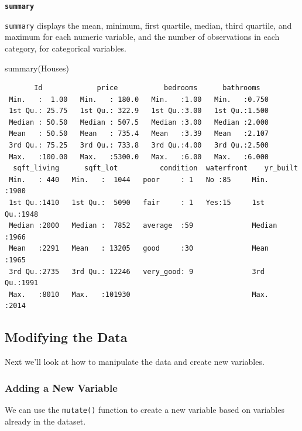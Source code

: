 \documentclass[
  letterpaper,
  DIV=11,
  numbers=noendperiod]{scrreprt}
\newenvironment{Shaded}{\begin{snugshade}}{\end{snugshade}}
\newcommand{\FunctionTok}[1]{\textcolor[rgb]{0.28,0.35,0.67}{#1}}
\newcommand{\NormalTok}[1]{\textcolor[rgb]{0.00,0.23,0.31}{#1}}
\begin{document}
\textbf{\texttt{summary}}

\texttt{summary} displays the mean, minimum, first quartile, median,
third quartile, and maximum for each numeric variable, and the number of
observations in each category, for categorical variables.

\begin{Shaded}
\begin{Highlighting}[]
\FunctionTok{summary}\NormalTok{(Houses)}
\end{Highlighting}
\end{Shaded}

\begin{verbatim}
       Id             price           bedrooms      bathrooms    
 Min.   :  1.00   Min.   : 180.0   Min.   :1.00   Min.   :0.750  
 1st Qu.: 25.75   1st Qu.: 322.9   1st Qu.:3.00   1st Qu.:1.500  
 Median : 50.50   Median : 507.5   Median :3.00   Median :2.000  
 Mean   : 50.50   Mean   : 735.4   Mean   :3.39   Mean   :2.107  
 3rd Qu.: 75.25   3rd Qu.: 733.8   3rd Qu.:4.00   3rd Qu.:2.500  
 Max.   :100.00   Max.   :5300.0   Max.   :6.00   Max.   :6.000  
  sqft_living      sqft_lot          condition  waterfront    yr_built   
 Min.   : 440   Min.   :  1044   poor     : 1   No :85     Min.   :1900  
 1st Qu.:1410   1st Qu.:  5090   fair     : 1   Yes:15     1st Qu.:1948  
 Median :2000   Median :  7852   average  :59              Median :1966  
 Mean   :2291   Mean   : 13205   good     :30              Mean   :1965  
 3rd Qu.:2735   3rd Qu.: 12246   very_good: 9              3rd Qu.:1991  
 Max.   :8010   Max.   :101930                             Max.   :2014  
\end{verbatim}

\subsection{Modifying the Data}\label{modifying-the-data}

Next we'll look at how to manipulate the data and create new variables.

\subsubsection*{Adding a New Variable}\label{adding-a-new-variable}

We can use the \texttt{mutate()} function to create a new variable based
on variables already in the dataset.
\end{document}
